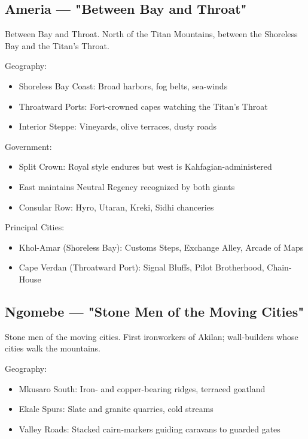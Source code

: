 \subsection{Ameria — "Between Bay and Throat"}
\label{sec:ameria}

Between Bay and Throat. North of the Titan Mountains, between the Shoreless Bay and the Titan's Throat.

Geography:
\begin{itemize}
    \item Shoreless Bay Coast: Broad harbors, fog belts, sea-winds
    \item Throatward Ports: Fort-crowned capes watching the Titan's Throat
    \item Interior Steppe: Vineyards, olive terraces, dusty roads
\end{itemize}

Government:
\begin{itemize}
    \item Split Crown: Royal style endures but west is Kahfagian-administered
    \item East maintains Neutral Regency recognized by both giants
    \item Consular Row: Hyro, Utaran, Kreki, Sidhi chanceries
\end{itemize}

Principal Cities:
\begin{itemize}
    \item Khol-Amar (Shoreless Bay): Customs Steps, Exchange Alley, Arcade of Maps
    \item Cape Verdan (Throatward Port): Signal Bluffs, Pilot Brotherhood, Chain-House
\end{itemize}

\subsection{Ngomebe — "Stone Men of the Moving Cities"}
\label{sec:ngomebe}

Stone men of the moving cities. First ironworkers of Akilan; wall-builders whose cities walk the mountains.

Geography:
\begin{itemize}
    \item Mkusaro South: Iron- and copper-bearing ridges, terraced goatland
    \item Ekale Spurs: Slate and granite quarries, cold streams
    \item Valley Roads: Stacked cairn-markers guiding caravans to guarded gates
\end{itemize}

